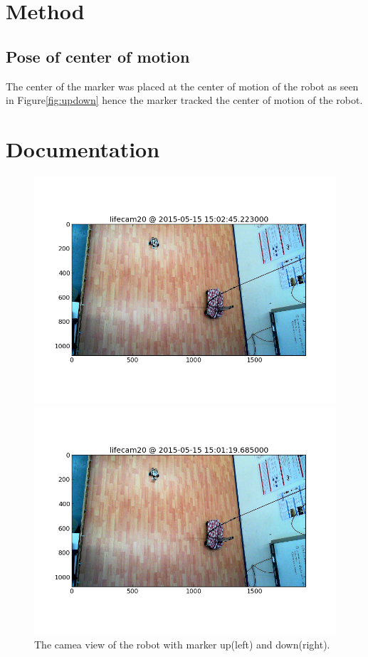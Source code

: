 \documentclass{scrartcl}
\begin{document}
\section{Method}
\subsection{Pose of center of motion}
The center of the marker was placed at the center of motion of the robot as seen in Figure\ref{fig:updown} hence the marker tracked the center of motion of the robot.

\section{Documentation}

\begin{figure}[H]
\centering
\begin{minipage}{.5\textwidth}
  \centering
  \includegraphics[width=.8\linewidth]{img/marker_up.png}
\end{minipage}%
\begin{minipage}{.5\textwidth}
  \centering
  \includegraphics[width=.8\linewidth]{img/marker_down.png}
\end{minipage}
\caption{The camea view of the robot with marker up(left) and down(right).}
\label{fig:camera}
\end{figure}
\end{document}
